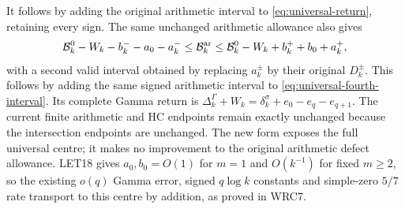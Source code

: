 It follows by adding the original arithmetic interval to
\eqref{eq:universal-return}, retaining every sign.
The same unchanged arithmetic allowance also gives
\begin{equation}
 \mathcal B_k^0-W_k-b_k^--a_0-a_k^-
 \leq\mathcal B_k^{\rm ar}
 \leq\mathcal B_k^0-W_k+b_k^++b_0+a_k^+,
 \label{eq:universal-centred-arithmetic}
\end{equation}
with a second valid interval obtained by replacing $a_k^\pm$
by their original $D_k^\pm$. This follows by adding the same
signed arithmetic interval to \eqref{eq:universal-fourth-interval}.
Its complete Gamma return is
$\Delta_k^\Gamma+W_k=\delta_k^\sigma+e_0-e_q-e_{q+1}$.
The current finite arithmetic and HC endpoints remain exactly
unchanged because the intersection endpoints are unchanged.
The new form exposes the full universal centre; it makes no
improvement to the original arithmetic defect allowance.
LET18 gives $a_0,b_0=O(1)$ for $m=1$ and $O(k^{-1})$
for fixed $m\geq2$, so the existing $o(q)$ Gamma error,
signed $q\log k$ constants and simple-zero $5/7$ rate
transport to this centre by addition, as proved in WRC7.